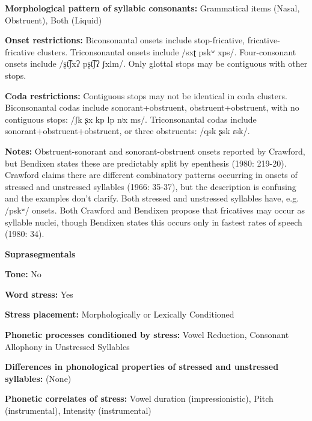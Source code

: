 \textbf{Morphological pattern of syllabic consonants:} Grammatical items (Nasal, Obstruent), Both (Liquid)



\textbf{Onset restrictions:} Biconsonantal onsets include stop-fricative, fricative-fricative clusters. Triconsonantal onsets include /sxʈ pskʷ xps/. Four-consonant onsets include /ʂt͡ʃxʔ pʂt͡ʃʔ ʃxlm/. Only glottal stops may be contiguous with other stops.



\textbf{Coda restrictions:} Contiguous stops may not be identical in coda clusters. Biconsonantal codas include sonorant+obstruent, obstruent+obstruent, with no contiguous stops: /ʃk ʂx kp lp nʲx ms/. Triconsonantal codas include sonorant+obstruent+obstruent, or three obstruents: /qsk ʂsk ɾsk/.



\textbf{Notes:} Obstruent-sonorant and sonorant-obstruent onsets reported by Crawford, but Bendixen states these are predictably split by epenthesis (1980: 219-20). Crawford claims there are different combinatory patterns occurring in onsets of stressed and unstressed syllables (1966: 35-37), but the description is confusing and the examples don’t clarify. Both stressed and unstressed syllables have, e.g. /pskʷ/ onsets. Both Crawford and Bendixen propose that fricatives may occur as syllable nuclei, though Bendixen states this occurs only in fastest rates of speech (1980: 34).



\textbf{Suprasegmentals}



\textbf{Tone:} No



\textbf{Word stress:} Yes



\textbf{Stress placement:} Morphologically or Lexically Conditioned



\textbf{Phonetic processes conditioned by stress:} Vowel Reduction, Consonant Allophony in Unstressed Syllables



\textbf{Differences in phonological properties of stressed and unstressed syllables:} (None)



\textbf{Phonetic correlates of stress:} Vowel duration (impressionistic), Pitch (instrumental), Intensity (instrumental)



